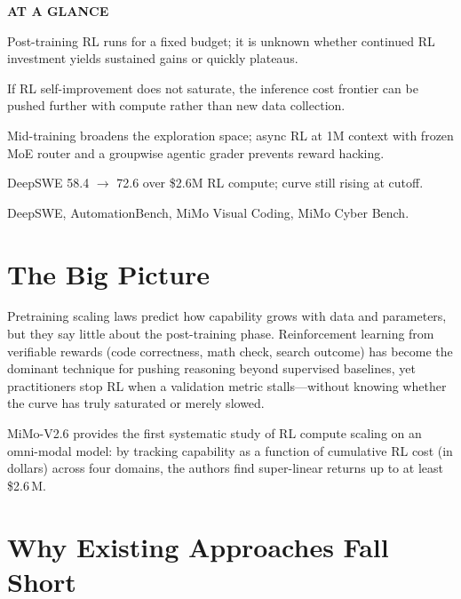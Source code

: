 \documentclass[10pt,twocolumn]{article}
\begin{document}
\begin{mdframed}[backgroundcolor=boxgray,linecolor=rulered,linewidth=1pt,
    innerleftmargin=6pt,innerrightmargin=6pt,
    innertopmargin=6pt,innerbottommargin=6pt]
\textbf{\small AT A GLANCE}\par\vspace{4pt}
\begin{description}[leftmargin=0pt,labelsep=4pt,itemsep=2pt,parsep=0pt,
    font=\small\bfseries]
  \item[Problem:] Post-training RL runs for a fixed budget; it is unknown whether
    continued RL investment yields sustained gains or quickly plateaus.
  \item[Why it matters:] If RL self-improvement does not saturate, the inference
    cost frontier can be pushed further with compute rather than new data collection.
  \item[Method:] Mid-training broadens the exploration space; async RL at 1M context
    with frozen MoE router and a groupwise agentic grader prevents reward hacking.
  \item[Result:] DeepSWE 58.4 $\to$ 72.6 over \$2.6M RL compute; curve still rising
    at cutoff.
  \item[Evidence:] DeepSWE, AutomationBench, MiMo Visual Coding, MiMo Cyber Bench.
\end{description}
\end{mdframed}

\section{The Big Picture}

Pretraining scaling laws predict how capability grows with data and parameters, but
they say little about the post-training phase. Reinforcement learning from verifiable
rewards (code correctness, math check, search outcome) has become the dominant
technique for pushing reasoning beyond supervised baselines, yet practitioners stop
RL when a validation metric stalls---without knowing whether the curve has truly
saturated or merely slowed.

MiMo-V2.6 provides the first systematic study of RL compute scaling on an omni-modal
model: by tracking capability as a function of cumulative RL cost (in dollars) across
four domains, the authors find super-linear returns up to at least \$2.6\,M.

\section{Why Existing Approaches Fall Short}
\end{document}
